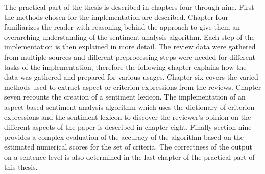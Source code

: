 The practical part of the thesis is described in chapters four through nine. First the methods chosen for the implementation are described. Chapter four familiarizes the reader with reasoning behind the approach to give them an overarching understanding of the sentiment analysis algorithm. Each step of the implementation is then explained in more detail. The review data were gathered from multiple sources and different preprocessing steps were needed for different tasks of the implementation, therefore the following chapter explains how the data was gathered and prepared for various usages. Chapter six covers the varied methods used to extract aspect or criterion expressions from the reviews. Chapter seven recounts the creation of a sentiment lexicon. The implementation of an aspect-based sentiment analysis algorithm which uses the dictionary of criterion expressions and the sentiment lexicon to discover the reviewer's opinion on the different aspects of the paper is described in chapter eight. Finally section nine provides a complex evaluation of the accuracy of the algorithm based on the estimated numerical scores for the set of criteria. The correctness of the output on a sentence level is also determined in the last chapter of the practical part of this thesis.

